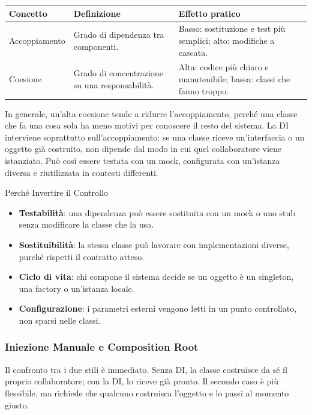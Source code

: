 \documentclass[12pt]{extarticle}
\begin{document}
\begin{center}
\small
\begin{tabular}{p{3.4cm}p{6.0cm}p{6.4cm}}
    \toprule
    \textbf{Concetto} & \textbf{Definizione} & \textbf{Effetto pratico} \\
    \midrule
    Accoppiamento & Grado di dipendenza tra componenti. & Basso: sostituzione e test più semplici; alto: modifiche a cascata. \\
    \addlinespace
    Coesione & Grado di concentrazione su una responsabilità. & Alta: codice più chiaro e manutenibile; bassa: classi che fanno troppo. \\
    \bottomrule
\end{tabular}
\end{center}

\noindent In generale, un'alta coesione tende a ridurre l'accoppiamento, perché una classe che fa una cosa sola ha meno motivi per conoscere il resto del sistema. La DI interviene soprattutto sull'accoppiamento: se una classe riceve un'interfaccia o un oggetto già costruito, non dipende dal modo in cui quel collaboratore viene istanziato. Può così essere testata con un mock, configurata con un'istanza diversa e riutilizzata in contesti differenti.

\begin{cbox}{Perché Invertire il Controllo}
\begin{itemize}
    \item \textbf{Testabilità}: una dipendenza può essere sostituita con un mock o uno stub senza modificare la classe che la usa.
    \item \textbf{Sostituibilità}: la stessa classe può lavorare con implementazioni diverse, purché rispetti il contratto atteso.
    \item \textbf{Ciclo di vita}: chi compone il sistema decide se un oggetto è un singleton, una factory o un'istanza locale.
    \item \textbf{Configurazione}: i parametri esterni vengono letti in un punto controllato, non sparsi nelle classi.
\end{itemize}
\end{cbox}

\subsubsection{Iniezione Manuale e Composition Root}

\noindent Il confronto tra i due stili è immediato. Senza DI, la classe costruisce da sé il proprio collaboratore; con la DI, lo riceve già pronto. Il secondo caso è più flessibile, ma richiede che qualcuno costruisca l'oggetto e lo passi al momento giusto.
\end{document}
